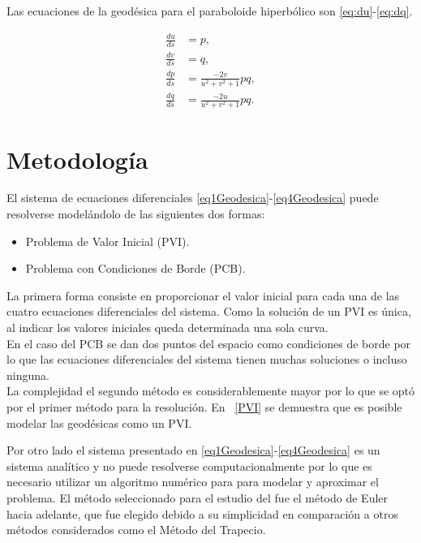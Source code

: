\documentclass{endm}
\begin{document}
Las ecuaciones de la geod\'esica para el paraboloide hiperb\'olico son \ref{eq:du}-\ref{eq:dq}.

\begin{align}
\frac{du}{ds}&=p,\label{eq:du} \\
\frac{dv}{ds}&=q,\label{eq:dv}     \\
\frac{dp}{ds}&=\frac{-2v}{u^2+v^2+1} pq, \label{eq:dp}\\ 
\frac{dq}{ds}&=\frac{-2u}{u^2+v^2+1} pq. \label{eq:dq}
\end{align}



\clearpage

%
\section{Metodolog\'ia}\label{Metodo}
El sistema de ecuaciones diferenciales \ref{eq1Geodesica}-\ref{eq4Geodesica} puede resolverse model\'andolo de las siguientes dos formas:
\begin{itemize}
    \item Problema de Valor Inicial (PVI).
    \item Problema con Condiciones de Borde (PCB).
\end{itemize}

La primera forma consiste en proporcionar el valor inicial para cada una de las cuatro ecuaciones diferenciales del sistema.
Como la soluci\'on de un PVI es \'unica, al indicar los valores iniciales queda determinada una sola curva. \\
En el caso del PCB se dan dos puntos del espacio como condiciones de borde por lo que las ecuaciones diferenciales del sistema tienen muchas soluciones o incluso ninguna. \\
La complejidad el segundo m\'etodo es considerablemente mayor por lo que se opt\'o por el primer m\'etodo para la resoluci\'on. En ~\ref{PVI} se demuestra que es posible modelar las geod\'esicas como un PVI.

Por otro lado el sistema presentado en \ref{eq1Geodesica}-\ref{eq4Geodesica} es un sistema anal\'itico y no puede resolverse computacionalmente por lo que es necesario utilizar un algoritmo num\'erico para para modelar y aproximar el problema. El m\'etodo seleccionado para el estudio del fue el m\'etodo de Euler hacia adelante, que fue elegido debido a su simplicidad en comparaci\'on a otros m\'etodos considerados como el M\'etodo del Trapecio.
\end{document}
